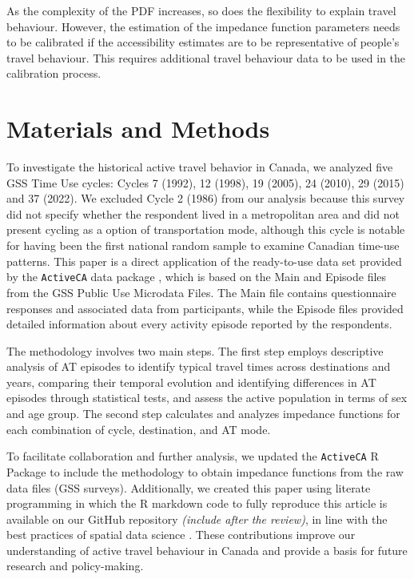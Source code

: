 \documentclass[preprint, 3p,
authoryear]{elsarticle} %
\begin{document}
As the complexity of the PDF increases, so does the flexibility to
explain travel behaviour. However, the estimation of the impedance
function parameters needs to be calibrated if the accessibility
estimates are to be representative of people's travel behaviour. This
requires additional travel behaviour data to be used in the calibration
process.

\section{Materials and Methods}\label{materials-and-methods}

To investigate the historical active travel behavior in Canada, we
analyzed five GSS Time Use cycles: Cycles 7 (1992), 12 (1998), 19
(2005), 24 (2010), 29 (2015) and 37 (2022). We excluded Cycle 2 (1986)
from our analysis because this survey did not specify whether the
respondent lived in a metropolitan area and did not present cycling as a
option of transportation mode, although this cycle is notable for having
been the first national random sample to examine Canadian time-use
patterns. This paper is a direct application of the ready-to-use data
set provided by the \texttt{ActiveCA} data package
\citeyearpar{dossantos2025}, which is based on the Main and Episode
files from the GSS Public Use Microdata Files. The Main file contains
questionnaire responses and associated data from participants, while the
Episode files provided detailed information about every activity episode
reported by the respondents.

The methodology involves two main steps. The first step employs
descriptive analysis of AT episodes to identify typical travel times
across destinations and years, comparing their temporal evolution and
identifying differences in AT episodes through statistical tests, and
assess the active population in terms of sex and age group. The second
step calculates and analyzes impedance functions for each combination of
cycle, destination, and AT mode.

To facilitate collaboration and further analysis, we updated the
\texttt{ActiveCA} R Package to include the methodology to obtain
impedance functions from the raw data files (GSS surveys). Additionally,
we created this paper using literate programming in which the R markdown
code to fully reproduce this article is available on our GitHub
repository \emph{(include after the review)}, in line with the best
practices of spatial data science \citep{arribas-bel2021, paez2021}.
These contributions improve our understanding of active travel behaviour
in Canada and provide a basis for future research and policy-making.
\end{document}
